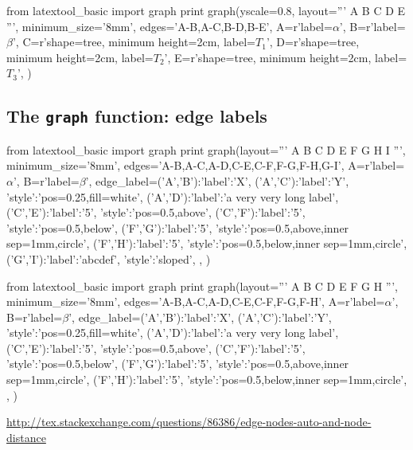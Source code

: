 \begin{python}
from latextool_basic import graph
print graph(yscale=0.8, layout='''
     A
   B   C
  D E
''',
minimum_size='8mm',
edges='A-B,A-C,B-D,B-E',
A=r'label=$\alpha$',
B=r'label=$\beta$',
C=r'shape=tree, minimum height=2cm, label=$T_1$',
D=r'shape=tree, minimum height=2cm, label=$T_2$',
E=r'shape=tree, minimum height=2cm, label=$T_3$',
)
\end{python}


\newpage
\subsection{The \texttt{graph} function: edge labels}


\begin{console}
from latextool_basic import graph
print graph(layout='''
          A
   B      C      D
       E     F
          G     H
       I
''',
minimum_size='8mm',
edges='A-B,A-C,A-D,C-E,C-F,F-G,F-H,G-I',
A=r'label=$\alpha$',
B=r'label=$\beta$',
edge_label={('A','B'):{'label':'X'},
            ('A','C'):{'label':'Y', 'style':'pos=0.25,fill=white'},
            ('A','D'):{'label':'a very very long label'},
            ('C','E'):{'label':'5', 'style':'pos=0.5,above'},
            ('C','F'):{'label':'5', 'style':'pos=0.5,below'},
            ('F','G'):{'label':'5', 'style':'pos=0.5,above,inner sep=1mm,circle'},
            ('F','H'):{'label':'5', 'style':'pos=0.5,below,inner sep=1mm,circle'},
            ('G','I'):{'label':'abcdef', 'style':'sloped'},
           },
)
\end{console}
\begin{python}
from latextool_basic import graph
print graph(layout='''
          A
   B      C      D
       E     F
          G     H
''',
minimum_size='8mm',
edges='A-B,A-C,A-D,C-E,C-F,F-G,F-H',
A=r'label=$\alpha$',
B=r'label=$\beta$',
edge_label={('A','B'):{'label':'X'},
            ('A','C'):{'label':'Y', 'style':'pos=0.25,fill=white'},
            ('A','D'):{'label':'a very very long label'},
            ('C','E'):{'label':'5', 'style':'pos=0.5,above'},
            ('C','F'):{'label':'5', 'style':'pos=0.5,below'},
            ('F','G'):{'label':'5', 'style':'pos=0.5,above,inner sep=1mm,circle'},
            ('F','H'):{'label':'5', 'style':'pos=0.5,below,inner sep=1mm,circle'},
           },
)
\end{python}


\url{http://tex.stackexchange.com/questions/86386/edge-nodes-auto-and-node-distance}
